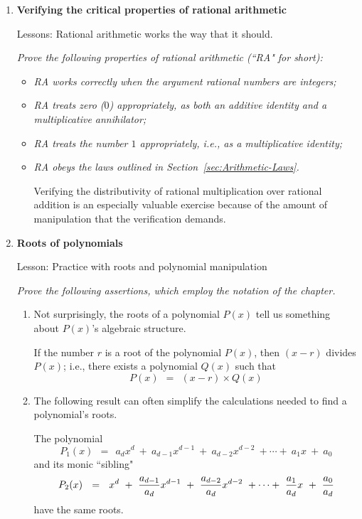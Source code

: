 \begin{enumerate}
\medskip\item
{\bf Verifying the critical properties of rational arithmetic}

{\sc Lessons:} Rational arithmetic works the way that it should.

\smallskip

{\em Prove the following properties of rational arithmetic (``RA" for short):}
\begin{itemize}
\item
{\em RA works correctly when the argument rational numbers are integers;}
\medskip\item
{\em RA treats zero ($0$) appropriately, as both an additive identity and a multiplicative annihilator;}
\medskip\item
{\em RA treats the number $1$ appropriately, i.e., as a multiplicative identity;}
\medskip\item
{\em RA obeys the laws outlined in Section~\ref{sec:Arithmetic-Laws}.}

\smallskip

Verifying the distributivity of rational multiplication over rational addition is an especially valuable exercise because of the amount of manipulation that the verification demands.
\end{itemize}

\medskip\item
{\bf Roots of polynomials}

{\sc Lesson:} Practice with roots and polynomial manipulation

\smallskip

{\em Prove the following assertions, which employ the notation of the chapter.}
  \begin{enumerate}
  \item
Not surprisingly, the roots of a polynomial $P(x)$ tell us something about $P(x)$'s algebraic structure.

\begin{prop}
If the number $r$ is a root of the polynomial $P(x)$, then $(x-r)$ divides $P(x)$; i.e., there exists a polynomial $Q(x)$ such that
\[ P(x) \ \ = \ \ (x-r) \times Q(x) \]
\end{prop}
  
  \medskip\item
The following result can often simplify the calculations needed to find a polynomial's roots.

\begin{prop}
The polynomial
\[ P_1(x) \ \ = \ \ a_d x^d \ + \ a_{d-1} x^{d-1} \ + \ a_{d-2} x^{d-2} \ + \cdots + \ a_1 x \ + \ a_0 \]
and its monic ``sibling"
\[ P_2(x) \ \ = \ \ x^d \ + \ {a_{d-1} \over a_d } x^{d-1} \ + \ {a_{d-2} \over a_d } x^{d-2} \ + \cdots + \ {a_1 \over a_d } x \ + \ {a_0  \over a_d }
\]
have the same roots.
\end{prop}


\end{enumerate}
\end{enumerate}
